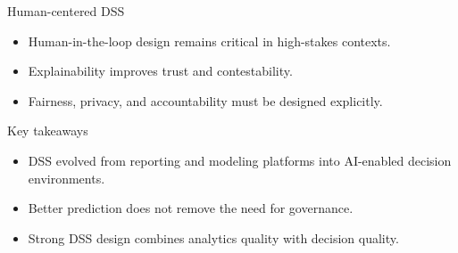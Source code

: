 \documentclass[aspectratio=169,11pt]{beamer}
\begin{document}
\begin{frame}{Human-centered DSS}
  \begin{itemize}
    \item Human-in-the-loop design remains critical in high-stakes contexts.
    \item Explainability improves trust and contestability.
    \item Fairness, privacy, and accountability must be designed explicitly.
  \end{itemize}
\end{frame}


\begin{frame}{Key takeaways}
  \begin{itemize}
    \item DSS evolved from reporting and modeling platforms into AI-enabled
    decision environments.
    \item Better prediction does not remove the need for governance.
    \item Strong DSS design combines analytics quality with decision quality.
  \end{itemize}
\end{frame}
\end{document}

